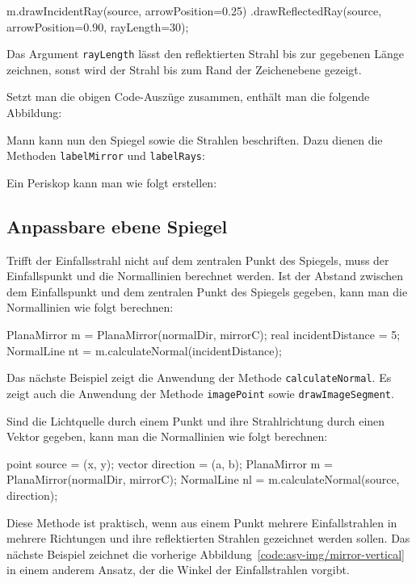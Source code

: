 \begin{asycode}
m.drawIncidentRay(source, arrowPosition=0.25)
 .drawReflectedRay(source, arrowPosition=0.90, rayLength=30); 
\end{asycode}

Das Argument \texttt{rayLength} lässt den reflektierten Strahl bis zur gegebenen Länge zeichnen, 
sonst wird der Strahl bis zum Rand der Zeichenebene gezeigt.

Setzt man die obigen Code-Auszüge zusammen, enthält man die folgende Abbildung:


Mann kann nun den Spiegel sowie die Strahlen beschriften.
Dazu dienen die Methoden \texttt{labelMirror} und \texttt{labelRays}:


Ein Periskop kann man wie folgt erstellen:


\subsection{Anpassbare ebene Spiegel}


Trifft der Einfallsstrahl nicht auf dem zentralen Punkt des Spiegels, muss der Einfallspunkt und die Normallinien berechnet werden.
Ist der Abstand zwischen dem Einfallspunkt und dem zentralen Punkt des Spiegels gegeben, kann man die Normallinien wie folgt berechnen:

\begin{asycode}
PlanaMirror m = PlanaMirror(normalDir, mirrorC);
real incidentDistance = 5;
NormalLine nt = m.calculateNormal(incidentDistance);
\end{asycode}


Das nächste Beispiel zeigt die Anwendung der Methode \texttt{calculateNormal}.
Es zeigt auch die Anwendung der Methode \texttt{imagePoint} sowie \texttt{drawImageSegment}.


Sind die Lichtquelle durch einem Punkt und ihre Strahlrichtung durch einen Vektor gegeben, kann man die Normallinien wie folgt berechnen:

\begin{asycode}
point source = (x, y);
vector direction = (a, b);
PlanaMirror m = PlanaMirror(normalDir, mirrorC);
NormalLine nl = m.calculateNormal(source, direction);
\end{asycode}

Diese Methode ist praktisch, wenn aus einem Punkt mehrere Einfallstrahlen in mehrere Richtungen und ihre reflektierten Strahlen gezeichnet werden sollen.
Das nächste Beispiel zeichnet die vorherige Abbildung~\ref{code:asy-img/mirror-vertical} in einem anderem Ansatz, der die Winkel der Einfallstrahlen vorgibt.










